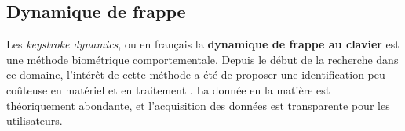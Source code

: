 \subsection{Dynamique de frappe}
Les \textit{keystroke dynamics}, ou en français la \textbf{dynamique de frappe au clavier} est une méthode biométrique comportementale. Depuis le début de la recherche dans ce domaine, l'intérêt de cette méthode a été de proposer une identification peu coûteuse en matériel et en traitement \cite{monrose1997}. La donnée en la matière est théoriquement abondante, et l'acquisition des données est transparente pour les utilisateurs.



